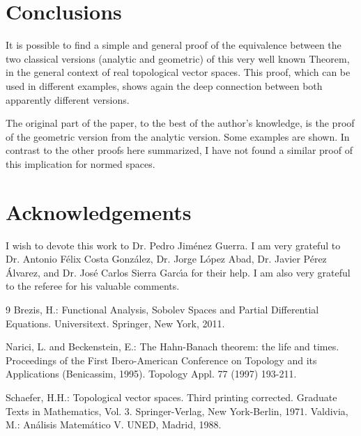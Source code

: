\documentclass{article}
\begin{document}
\section{Conclusions}

It is possible to find a simple and general proof of the equivalence between
the two classical versions (analytic and geometric) of this very well known
Theorem, in the general context of real topological vector spaces. This proof, which can be used in different examples, shows again the deep connection between both apparently different versions.

The original part of the paper, to the best of the author's knowledge, is the proof of the geometric version from the analytic version. Some examples are shown. In contrast to the other proofs here summarized, I have not found a similar proof of this implication for normed spaces.

\section{Acknowledgements}

I wish to devote this work to Dr. Pedro Jim\'{e}nez Guerra. I am very grateful to Dr. Antonio F\'{e}lix Costa Gonz\'{a}lez, Dr. Jorge L\'{o}pez Abad, Dr. Javier P\'{e}rez \'{A}lvarez, and Dr. Jos\'{e} Carlos Sierra Garc\'{\i}a for their help. I am also very grateful to the referee for his valuable comments.

\begin{thebibliography}{9}
 Brezis, H.: Functional Analysis, Sobolev Spaces and Partial Differential Equations. Universitext. Springer, New York, 2011.

 Narici, L. and Beckenstein, E.: The Hahn-Banach theorem: the life and times. Proceedings of the First Ibero-American Conference on Topology and its Applications (Benicassim, 1995). Topology Appl. 77 (1997) 193-211.

 Schaefer, H.H.: Topological vector spaces. Third printing corrected. Graduate Texts in Mathematics, Vol. 3. Springer-Verlag, New York-Berlin, 1971.
 Valdivia, M.: An\'{a}lisis Matem\'{a}tico V. UNED, Madrid, 1988.
\end{thebibliography}
\end{document}
